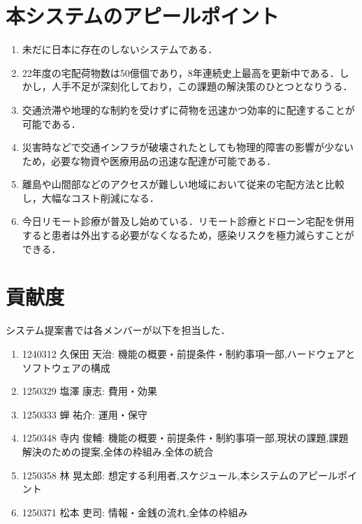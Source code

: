 \documentclass[a4paper, titlepage]{jsarticle}
\begin{document}
\section{本システムのアピールポイント}
\begin{enumerate}
        \item 未だに日本に存在のしないシステムである．
        \item 22年度の宅配荷物数は50億個であり，8年連続史上最高を更新中である．しかし，人手不足が深刻化しており，この課題の解決策のひとつとなりうる．
        \item 交通渋滞や地理的な制約を受けずに荷物を迅速かつ効率的に配達することが可能である．
        \item 災害時などで交通インフラが破壊されたとしても物理的障害の影響が少ないため，必要な物資や医療用品の迅速な配達が可能である．
        \item 離島や山間部などのアクセスが難しい地域において従来の宅配方法と比較し，大幅なコスト削減になる．
        \item 今日リモート診療が普及し始めている．リモート診療とドローン宅配を併用すると患者は外出する必要がなくなるため，感染リスクを極力減らすことができる．
\end{enumerate}

\section{貢献度}
システム提案書では各メンバーが以下を担当した．
\begin{enumerate}
        \item 1240312 久保田 天治: 機能の概要・前提条件・制約事項一部,ハードウェアとソフトウェアの構成
        \item 1250329 塩澤 康志: 費用・効果
        \item 1250333 蝉 祐介: 運用・保守
        \item 1250348 寺内 俊輔: 機能の概要・前提条件・制約事項一部,現状の課題,課題解決のための提案,全体の枠組み,全体の統合
        \item 1250358 林 晃太郎: 想定する利用者,スケジュール,本システムのアピールポイント
        \item 1250371 松本 吏司: 情報・金銭の流れ,全体の枠組み
\end{enumerate}



\end{document}
